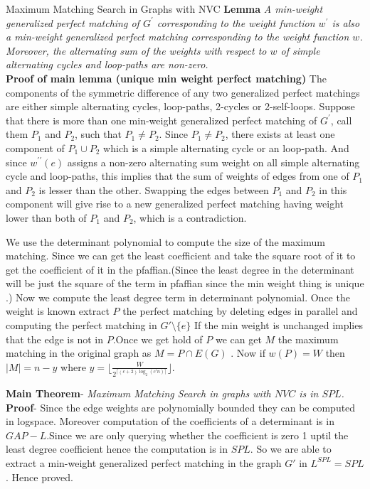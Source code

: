 \documentclass{beamer}
\begin{document}
\begin{frame}[allowframebreaks]{Maximum Matching Search in Graphs with NVC}
\textbf{Lemma} \textit{A min-weight generalized perfect matching of $G^{\prime}$ corresponding to the weight function $w^{\prime}$ is also a min-weight generalized perfect matching corresponding to the weight function $w$. Moreover, the alternating sum of the weights with respect to $w$ of simple alternating cycles and loop-paths are non-zero.}
\\
 \textbf{Proof of main lemma (unique min weight perfect matching)} The components of the symmetric difference of any two generalized perfect matchings are either simple alternating cycles, loop-paths, 2-cycles or 2-self-loops. Suppose that there is more than one min-weight generalized perfect matching of $G^{\prime}$, call them $P_1$ and $P_2$, such that $P_1 \neq P_2$. Since $P_1 \neq P_2$, there exists at least one component of $P_1 \cup P_2$ which is a simple alternating cycle or an loop-path. And since $w^{\prime \prime}(e)$ assigns a non-zero alternating sum weight on all simple alternating cycle and loop-paths, this implies that the sum of weights of edges from one of $P_1$ and $P_2$ is lesser than the other. Swapping the edges between $P_1$ and $P_2$ in this component will give rise to a new generalized perfect matching having weight lower than both of $P_1$ and $P_2$, which is a contradiction.

We use the determinant polynomial to compute the size of the maximum matching.
Since we can get the least coefficient and take the square root of it to get the coefficient of it in the pfaffian.(Since the least degree in the determinant will be just  the square of the term in pfaffian since the min weight thing is unique .)
Now we compute the least degree term in determinant polynomial. Once the weight is known extract $P$ the perfect matching by deleting edges in parallel and computing the perfect matching in $G'\setminus \{e\}$ If the min weight is unchanged implies that the edge is not in $P$.Once we get hold of $P$ we can get $M$ the maximum matching in the original graph as $M=P\cap E(G)$ . Now if $w(P)=W$ then $|M|=n-y$ where $y=\lfloor \frac{W}{2^{\lceil(c+2)\log_2(c'n)\rceil}}\rfloor$.

\break
\textbf{Main Theorem}-  \textit{Maximum Matching Search in graphs with $NVC$ is in $SPL$.}\\
\textbf{Proof}- Since the edge weights are polynomially bounded they can be computed in logspace. Moreover computation of the coefficients of a determinant is in $GAP-L$.Since we are only querying whether the coefficient is zero 1 uptil the least degree coefficient hence the computation is in $SPL$.
So we are able to extract a min-weight generalized perfect matching in the graph $G'$ in $L^{SPL}=SPL$. Hence proved.
\end{frame}
\end{document}
